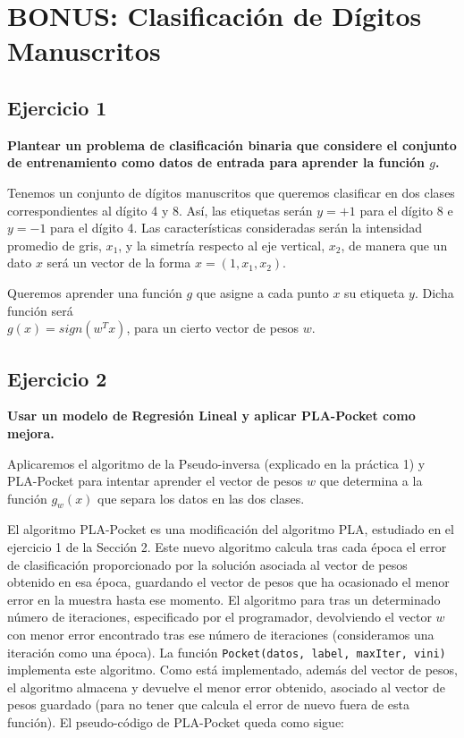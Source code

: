 \documentclass[a4]{article}
\begin{document}
\newpage
\section{BONUS: Clasificación de Dígitos Manuscritos}
\subsection{Ejercicio 1}

\textbf{Plantear un problema de clasificación binaria que considere el conjunto de entrenamiento
como datos de entrada para aprender la función $ g $.}

Tenemos un conjunto de dígitos manuscritos que queremos clasificar en dos clases correspondientes al dígito 4 y 8. Así, las etiquetas serán $y=+1$ para el dígito 8 e $y=-1$ para el dígito 4. Las características consideradas serán la intensidad promedio de gris, $x_1$, y la simetría respecto al eje vertical, $x_2$, de manera que un dato $x$ será un vector de la forma $x=(1,x_1,x_2)$. 

Queremos aprender una función $ g $ que asigne a cada punto $x$ su etiqueta $y$. Dicha función será\\ $g(x)=sign(w^Tx)$, para un cierto vector de pesos $w$. 

\subsection{Ejercicio 2}

\textbf{Usar un modelo de Regresión Lineal y aplicar PLA-Pocket como mejora.}

Aplicaremos el algoritmo de la Pseudo-inversa (explicado en la práctica 1) y PLA-Pocket para intentar aprender el vector de pesos $ w $ que determina a la función $ g_w(x) $ que separa los datos en las dos clases. 

El algoritmo PLA-Pocket es una modificación del algoritmo PLA, estudiado en el ejercicio 1 de la Sección 2. Este nuevo algoritmo calcula tras cada época el error de clasificación proporcionado por la solución asociada al vector de pesos obtenido en esa época, guardando el vector de pesos que ha ocasionado el menor  error en la muestra hasta ese momento. El algoritmo para tras un determinado número de iteraciones, especificado por el programador, devolviendo el vector $w$ con menor error encontrado tras ese número de iteraciones (consideramos una iteración como una época). La función \lstinline|Pocket(datos, label, maxIter, vini)| implementa este algoritmo. Como está implementado, además del vector de pesos, el algoritmo almacena y devuelve el menor error obtenido, asociado al vector de pesos guardado (para no tener que calcula el error de nuevo fuera de esta función). El pseudo-código de PLA-Pocket queda como sigue:
\end{document}
